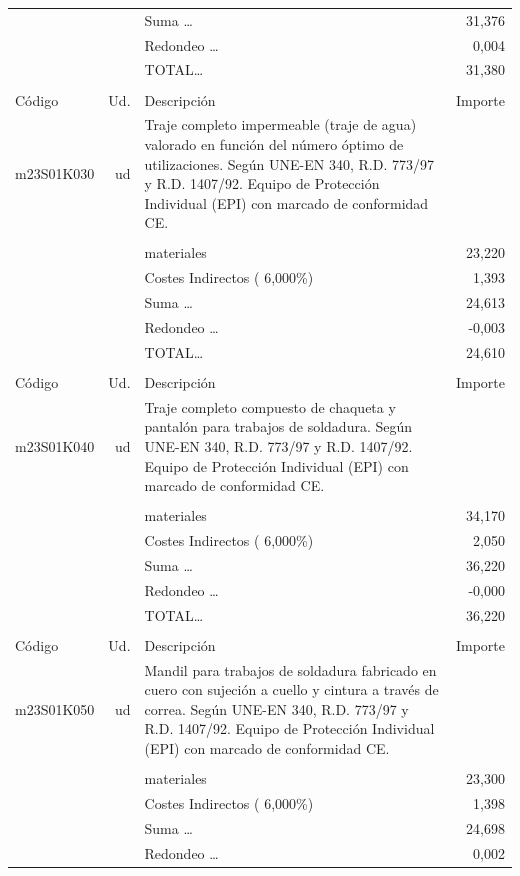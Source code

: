 \documentclass{book}%
\begin{document}
\begin{supertabular}{l r p{60mm} r}
&&Suma \ldots&    31,376\\%
&&Redondeo \ldots&     0,004\\%
%
&&TOTAL\ldots&    31,380\\%
&&&\\%
Código&Ud.&Descripción&Importe\\%
\hline%
m23S01K030&ud&Traje completo impermeable (traje de agua) valorado en función del número óptimo de utilizaciones. Según UNE{-}EN 340, R.D. 773/97 y R.D. 1407/92. Equipo de Protección Individual (EPI) con marcado de conformidad CE.&\\%
&&&\\%
&&materiales&    23,220\\%
&&Costes Indirectos (     6,000\%)&     1,393\\%
&&Suma \ldots&    24,613\\%
&&Redondeo \ldots&    {-}0,003\\%
%
&&TOTAL\ldots&    24,610\\%
&&&\\%
Código&Ud.&Descripción&Importe\\%
\hline%
m23S01K040&ud&Traje completo compuesto de chaqueta y pantalón para trabajos de soldadura. Según UNE{-}EN 340, R.D. 773/97 y R.D. 1407/92. Equipo de Protección Individual (EPI) con marcado de conformidad CE.&\\%
&&&\\%
&&materiales&    34,170\\%
&&Costes Indirectos (     6,000\%)&     2,050\\%
&&Suma \ldots&    36,220\\%
&&Redondeo \ldots&    {-}0,000\\%
%
&&TOTAL\ldots&    36,220\\%
&&&\\%
Código&Ud.&Descripción&Importe\\%
\hline%
m23S01K050&ud&Mandil para trabajos de soldadura fabricado en cuero con sujeción a cuello y cintura a través de correa. Según UNE{-}EN 340, R.D. 773/97 y R.D. 1407/92. Equipo de Protección Individual (EPI) con marcado de conformidad CE.&\\%
&&&\\%
&&materiales&    23,300\\%
&&Costes Indirectos (     6,000\%)&     1,398\\%
&&Suma \ldots&    24,698\\%
&&Redondeo \ldots&     0,002\\%

\end{supertabular}
\end{document}
